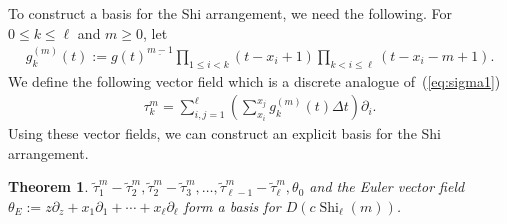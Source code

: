 \documentclass[pdftex]{sigma}
\numberwithin{equation}{section}
\newtheorem{Theorem}{Theorem}[section]
\newcommand{\Shi}{\operatorname{Shi}}
\newcommand{\sint}{\sum\nolimits}
\begin{document}
To construct a basis for the Shi arrangement, we need the following.
For $0\leq k\leq\ell$ and $m\geq 0$, let
\begin{gather*}
g_k^{(m)}(t):=
g(t)^{\underline{m-1}}
\prod_{1\leq i<k}(t-x_i+1)
\prod_{k<i\leq\ell}(t-x_i-m+1).
\end{gather*}
We define the following vector field which is a discrete analogue of~(\ref{eq:sigma1})
\begin{gather*}
\tau_k^m=
\sum_{i, j=1}^\ell
\left(
\sint_{x_i}^{x_j}g_k^{(m)}(t) \Delta t
\right)
\partial_i.
\end{gather*}
Using these vector fields, we can construct an explicit basis for the Shi arrangement.
\begin{Theorem}
$\widetilde{\tau}_1^m-\widetilde{\tau}_2^m, \widetilde{\tau}_2^m-\widetilde{\tau}_3^m, \dots,
\widetilde{\tau}_{\ell-1}^m-\widetilde{\tau}_\ell^m, \theta_0$ and
the Euler vector field
$\theta_E:=z\partial_z+x_1\partial_1+\cdots+x_\ell\partial_\ell$
form a basis for $D(c\Shi_\ell(m))$.
\end{Theorem}
\end{document}

